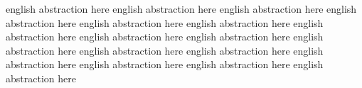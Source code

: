 english abstraction here english abstraction here english abstraction here english abstraction here english abstraction here english abstraction here english abstraction here english abstraction here english abstraction here english abstraction here english abstraction here english abstraction here english abstraction here english abstraction here english abstraction here english abstraction here